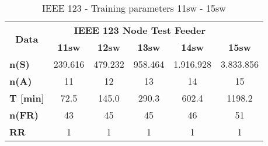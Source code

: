 \begin{table}
    \centering
    \caption{IEEE 123 - Training parameters 11sw - 15sw}
    \label{ch3:tab:td123_2}
    \begin{tabular}{lccccc} 
    \hline
    \multicolumn{1}{c}{\multirow{2}{*}{ \textbf{Data} }} & \multicolumn{5}{c}{\textbf{IEEE 123 Node Test Feeder}~ ~ ~ ~~ }                     \\ 
    \cline{2-6}
    \multicolumn{1}{c}{}                                 & \textbf{11sw}  & \textbf{12sw}  & \textbf{13sw}  & \textbf{14sw}  & \textbf{15sw}   \\ 
    \hline
     \textbf{n(S)}                                       & 239.616        & 479.232        & 958.464        & 1.916.928      & 3.833.856       \\
    \textbf{n(A)}                                        & 11             & 12             & 13             & 14             & 15              \\
    \textbf{T [min]}                                       & 72.5           & 145.0          & 290.3          & 602.4          & 1198.2          \\
    \textbf{n(FR)}                                       &     43           &     45           &    45            &  46              &   51              \\
    \textbf{RR}                                          & 1              & 1              & 1              & 1              & 1               \\
    \hline
    \end{tabular}
    \end{table}